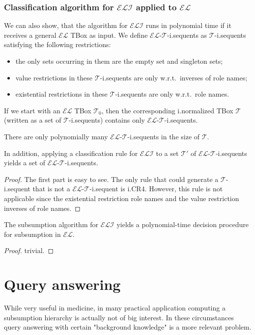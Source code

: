\newpage
\subsection{Classification algorithm for $\mathcal{ELI}$ applied to $\mathcal{EL}$}
We can also show, that the algorithm for $\mathcal{ELI}$ runs in polynomial time if it receives a general $\mathcal{EL}$ TBox as input.
We define $\mathcal{EL}$-$\mathcal{T}$-i.sequents as $\mathcal{T}$-i.sequents satisfying the following restrictions:
\begin{itemize}
	\item the only sets occurring in them are the empty set and singleton sets;
	\item value restrictions in these $\mathcal{T}$-i.sequents are only w.r.t.\ inverses of role names;
	\item existential restrictions in these $\mathcal{T}$-i.sequents are only w.r.t.\ role names.
\end{itemize}
If we start with an $\mathcal{EL}$ TBox $\mathcal{T}_0$, then the corresponding i.normalized TBox $\mathcal{T}$ 
(written as a set of $\mathcal{T}$-i.sequents) contains only $\mathcal{EL}$-$\mathcal{T}$-i.sequents.

\begin{lemma}
	There are only polynomially many $\mathcal{EL}$-$\mathcal{T}$-i.sequents in the size of $\mathcal{T}$.
	
	In addition, applying a classification rule for $\mathcal{ELI}$ to a set $\mathcal{T}'$
	of $\mathcal{EL}$-$\mathcal{T}$-i.sequents yields a set of $\mathcal{EL}$-$\mathcal{T}$-i.sequents.
\end{lemma}
\begin{proof}
	The first part is easy to see.
	\newline
	The only rule that could generate a $\mathcal{T}$-i.sequent that is not a $\mathcal{EL}$-$\mathcal{T}$-i.sequent is i.CR4.
	However, this rule is not applicable since the existential restriction role names
	and the value restriction inverses of role names.
\end{proof}

\begin{prop}
	The subsumption algorithm for $\mathcal{ELI}$ yields a polynomial-time decision procedure for subsumption in $\mathcal{EL}$.
\end{prop}
\begin{proof}
	trivial.
\end{proof}

\chapter{Query answering}
While very useful in medicine, in many practical application computing a subsumption hierarchy is actually not of big interest.
In these circumstances query answering with certain "background knowledge" is a more relevant problem.

